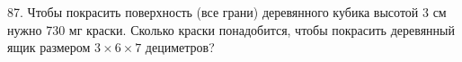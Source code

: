 87. Чтобы покрасить поверхность (все грани) деревянного кубика высотой 3 см нужно 730 мг краски. Сколько краски понадобится, чтобы покрасить деревянный ящик размером $3\times6\times7$ дециметров?\\
